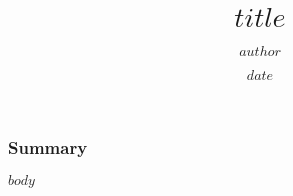 \documentclass[10pt, xetex]{beamer}
\title{$title$}
\author{$author$}
\date{$date$}
\begin{document}
\begin{frame}[plain]
  \titlepage
\end{frame}

\begin{frame}
  \frametitle{Summary}
  \tableofcontents
\end{frame}

$body$
\end{document}
